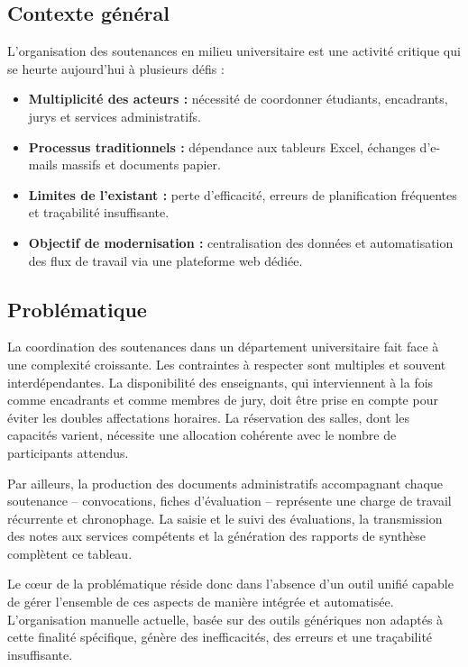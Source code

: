 \documentclass[12pt,a4paper]{article}
\begin{document}
\subsection{Contexte général}
\label{subsec:contexte}

L'organisation des soutenances en milieu universitaire est une activité critique
qui se heurte aujourd'hui à plusieurs défis :

\begin{itemize}[label=\textcolor{primary}{\textbullet}]
    \item \textbf{Multiplicité des acteurs :} nécessité de coordonner étudiants,
          encadrants, jurys et services administratifs.
    \item \textbf{Processus traditionnels :} dépendance aux tableurs Excel,
          échanges d'e-mails massifs et documents papier.
    \item \textbf{Limites de l'existant :} perte d'efficacité, erreurs de
          planification fréquentes et traçabilité insuffisante.
    \item \textbf{Objectif de modernisation :} centralisation des données et
          automatisation des flux de travail via une plateforme web dédiée.
\end{itemize}

\subsection{Problématique}
\label{subsec:problematique}

La coordination des soutenances dans un département universitaire fait face à
une complexité croissante. Les contraintes à respecter sont multiples et souvent
interdépendantes. La disponibilité des enseignants, qui interviennent à la fois
comme encadrants et comme membres de jury, doit être prise en compte pour éviter
les doubles affectations horaires. La réservation des salles, dont les capacités
varient, nécessite une allocation cohérente avec le nombre de participants
attendus.

Par ailleurs, la production des documents administratifs accompagnant chaque
soutenance -- convocations, fiches d'évaluation -- représente une charge de
travail récurrente et chronophage. La saisie et le suivi des évaluations, la
transmission des notes aux services compétents et la génération des rapports de
synthèse complètent ce tableau.

Le cœur de la problématique réside donc dans l'absence d'un outil unifié capable
de gérer l'ensemble de ces aspects de manière intégrée et automatisée.
L'organisation manuelle actuelle, basée sur des outils génériques non adaptés à
cette finalité spécifique, génère des inefficacités, des erreurs et une
traçabilité insuffisante.
\end{document}
